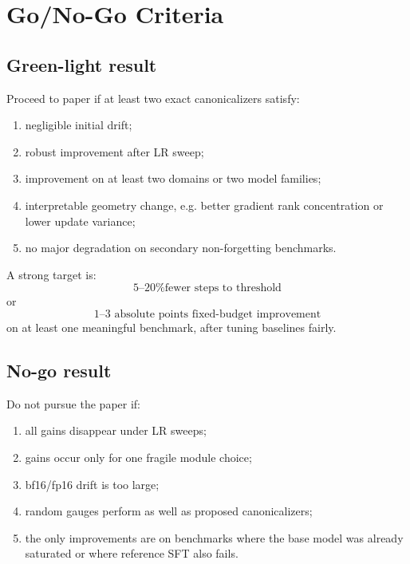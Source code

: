 \documentclass[11pt]{article}
\begin{document}
\section{Go/No-Go Criteria}

\subsection{Green-light result}

Proceed to paper if at least two exact canonicalizers satisfy:
\begin{enumerate}[leftmargin=*]
    \item negligible initial drift;
    \item robust improvement after LR sweep;
    \item improvement on at least two domains or two model families;
    \item interpretable geometry change, e.g. better gradient rank concentration or lower update variance;
    \item no major degradation on secondary non-forgetting benchmarks.
\end{enumerate}

A strong target is:
\[
    \text{5--20\% fewer steps to threshold}
\]
or
\[
    \text{1--3 absolute points fixed-budget improvement}
\]
on at least one meaningful benchmark, after tuning baselines fairly.

\subsection{No-go result}

Do not pursue the paper if:
\begin{enumerate}[leftmargin=*]
    \item all gains disappear under LR sweeps;
    \item gains occur only for one fragile module choice;
    \item bf16/fp16 drift is too large;
    \item random gauges perform as well as proposed canonicalizers;
    \item the only improvements are on benchmarks where the base model was already saturated or where reference SFT also fails.
\end{enumerate}

\end{document}
